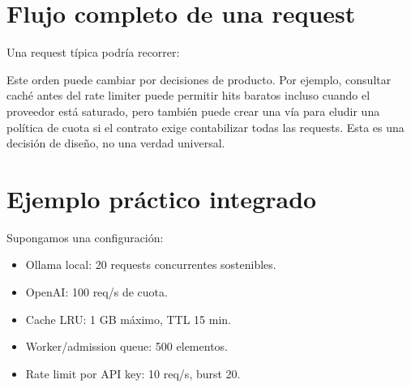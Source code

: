 \documentclass[11pt,a4paper]{article}
\begin{document}
\section{Flujo completo de una request}

Una request típica podría recorrer:

\begin{center}
\end{center}

Este orden puede cambiar por decisiones de producto. Por ejemplo, consultar caché antes del rate limiter puede permitir hits baratos incluso cuando el proveedor está saturado, pero también puede crear una vía para eludir una política de cuota si el contrato exige contabilizar todas las requests. Esta es una decisión de diseño, no una verdad universal.

\section{Ejemplo práctico integrado}

Supongamos una configuración:

\begin{itemize}
  \item Ollama local: 20 requests concurrentes sostenibles.
  \item OpenAI: 100 req/s de cuota.
  \item Cache LRU: 1 GB máximo, TTL 15 min.
  \item Worker/admission queue: 500 elementos.
  \item Rate limit por API key: 10 req/s, burst 20.
\end{itemize}
\end{document}
